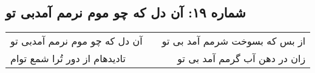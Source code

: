 \begin{center}
\section*{شماره ۱۹: آن دل که چو موم نرمم آمدبی تو}
\label{sec:019}
\begin{longtable}{l p{0.5cm} r}
آن دل که چو موم نرمم آمدبی تو
&&
از بس که بسوخت شرمم آمد بی تو
\\
تادیدهام از دور تُرا شمع توام
&&
زان در دهن آب گرمم آمد بی تو
\\
\end{longtable}
\end{center}
